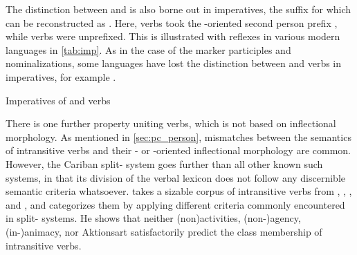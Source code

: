 The distinction between  and  is also borne out in imperatives, the suffix for which can be reconstructed as \PC {}.
Here,  verbs took the -oriented second person prefix , while  verbs were unprefixed.
This is illustrated with reflexes in various modern languages in \cref{tab:imp}.
As in the case of the  marker  participles and nominalizations, some languages have lost the distinction between  and  verbs in imperatives, for example \panare.

\begin{table}
	\centering
	\caption{Imperatives of  and  verbs \parencites[44, 89]{derbyshire1965textos}[161]{alves2017arara}[323]{triomeira1999}[227]{wayanatavares2005}[62]{koehn1986apalai}[Mopo/20]{koehns1994textos}[190]{hoff1968carib}[5, 17]{mattei1994diccionario}}
	\label{tab:imp}
	
\end{table}

There is one further property uniting  verbs, which is not based on inflectional morphology.
As mentioned in \cref{sec:pc_person}, mismatches between the semantics of intransitive verbs and their - or -oriented inflectional morphology are common.
However, the Cariban split- system goes further than all other known such systems, in that its division of the verbal lexicon does not follow any discernible semantic criteria whatsoever.
\textcite{meira2000split} takes a sizable corpus of intransitive verbs from \trio, \kalina, \apalai, and \wayana, and categorizes them by applying different criteria commonly encountered in split- systems.
He shows that neither (non\-)activities, %
(non-)agency, %
(in-)animacy, %
nor Aktionsart %
satisfactorily predict the class membership of intransitive verbs.

